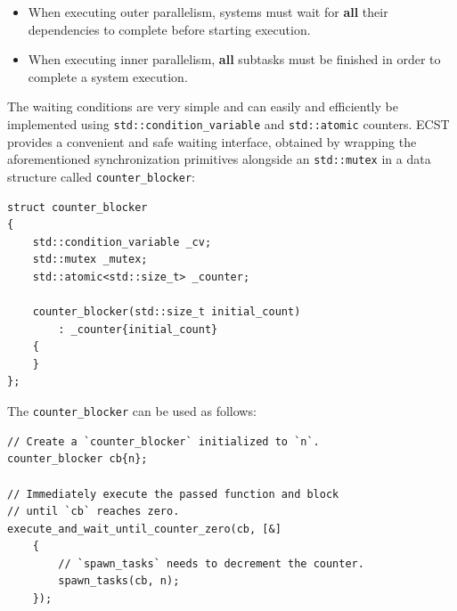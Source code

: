 \documentclass[twoside, 12pt, a4paper, openany]{book}
\begin{document}
\begin{itemize}
\item
  When executing outer parallelism, systems must wait for \textbf{all}
  their dependencies to complete before starting execution.
\item
  When executing inner parallelism, \textbf{all} subtasks must be
  finished in order to complete a system execution.
\end{itemize}

The waiting conditions are very simple and can easily and efficiently be
implemented using
\texttt{std::condition_variable}
and
\texttt{std::atomic}
counters. ECST provides a convenient and safe waiting interface,
obtained by wrapping the aforementioned synchronization primitives
alongside an
\texttt{std::mutex}
in a data structure called
\texttt{counter_blocker}:

\begin{verbatim}
struct counter_blocker
{
    std::condition_variable _cv;
    std::mutex _mutex;
    std::atomic<std::size_t> _counter;

    counter_blocker(std::size_t initial_count)
        : _counter{initial_count}
    {
    }
};
\end{verbatim}

The
\texttt{counter_blocker}
can be used as follows:

\begin{verbatim}
// Create a `counter_blocker` initialized to `n`.
counter_blocker cb{n};

// Immediately execute the passed function and block
// until `cb` reaches zero.
execute_and_wait_until_counter_zero(cb, [&]
    {
        // `spawn_tasks` needs to decrement the counter.
        spawn_tasks(cb, n);
    });
\end{verbatim}
\end{document}

